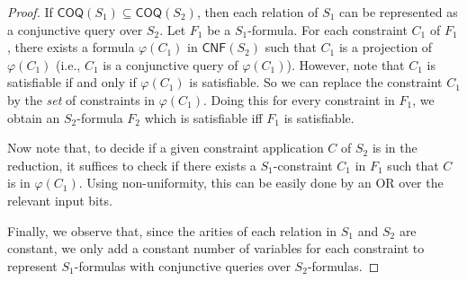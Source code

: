 \documentclass[10pt,a4paper]{article}
\newcommand{\CNF}{\mathsf{CNF}}
\def\sseq{\subseteq}
\newcommand{\COQ}{\mathsf{COQ}}
\begin{document}
\begin{proof}
    If $\COQ(S_1) \sseq \COQ(S_2)$, then
    each relation of $S_1$ can be represented as a conjunctive query
    over $S_2$.
    Let $F_1$ be a $S_1$-formula.
    For each constraint $C_1$ of $F_1$, there exists
    a formula $\varphi(C_1)$ in $\CNF(S_2)$
    such that
    $C_1$ is a projection of $\varphi(C_1)
    $ (i.e., $C_1$ is a conjunctive query of
    $\varphi(C_1)$).
    However, note that $C_1$ is satisfiable if and only if
    $\varphi(C_1)$ is satisfiable.
    So we can replace the constraint $C_1$ by the \emph{set} of constraints
    in $\varphi(C_1)$.
    Doing this for every constraint in $F_1$, we obtain an $S_2$-formula $F_2$
    which is satisfiable iff $F_1$ is satisfiable.

    Now note that, to decide if a given constraint application $C$ of
    $S_2$
    is in the reduction,
    it suffices
    to check if there exists a $S_1$-constraint $C_1$
    in $F_1$
    such that
    $C$ is in $\varphi(C_1)$.
    Using non-uniformity, this can be easily done
    by an OR over the relevant input bits.

    Finally, we observe that, since the arities of each relation in
    $S_1$ and $S_2$ are constant, we only add a constant number of
    variables for each constraint
    to represent $S_1$-formulas with conjunctive queries over $S_2$-formulas.
\end{proof}
\end{document}
